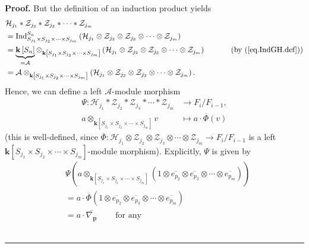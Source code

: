 \documentclass[numbers=enddot,12pt,final,onecolumn,notitlepage]{scrartcl}%
\theoremstyle{definition}
\newenvironment{proof}[1][Proof]{\noindent\textbf{#1.} }{\ \rule{0.5em}{0.5em}}
\begin{document}
\begin{proof}
But the definition of an induction product yields%
\begin{align*}
&  \mathcal{H}_{j_{1}}\ast\mathcal{Z}_{j_{2}}\ast\mathcal{Z}_{j_{3}}\ast
\cdots\ast\mathcal{Z}_{j_{m}}\\
&  =\operatorname*{Ind}\nolimits_{S_{j_{1}}\times S_{j_{2}}\times\cdots\times
S_{j_{m}}}^{S_{n}}\left(  \mathcal{H}_{j_{1}}\otimes\mathcal{Z}_{j_{2}}%
\otimes\mathcal{Z}_{j_{3}}\otimes\cdots\otimes\mathcal{Z}_{j_{m}}\right) \\
&  =\underbrace{\mathbf{k}\left[  S_{n}\right]  }_{=\mathcal{A}}%
\otimes_{\mathbf{k}\left[  S_{j_{1}}\times S_{j_{2}}\times\cdots\times
S_{j_{m}}\right]  }\left(  \mathcal{H}_{j_{1}}\otimes\mathcal{Z}_{j_{2}%
}\otimes\mathcal{Z}_{j_{3}}\otimes\cdots\otimes\mathcal{Z}_{j_{m}}\right)
\ \ \ \ \ \ \ \ \ \ \left(  \text{by (\ref{eq.IndGH.def})}\right) \\
&  =\mathcal{A}\otimes_{\mathbf{k}\left[  S_{j_{1}}\times S_{j_{2}}%
\times\cdots\times S_{j_{m}}\right]  }\left(  \mathcal{H}_{j_{1}}%
\otimes\mathcal{Z}_{j_{2}}\otimes\mathcal{Z}_{j_{3}}\otimes\cdots
\otimes\mathcal{Z}_{j_{m}}\right)  .
\end{align*}
Hence, we can define a left $\mathcal{A}$-module morphism%
\begin{align*}
\Psi:\mathcal{H}_{j_{1}}\ast\mathcal{Z}_{j_{2}}\ast\mathcal{Z}_{j_{3}}%
\ast\cdots\ast\mathcal{Z}_{j_{m}}  &  \rightarrow F_{i}/F_{i-1},\\
a\otimes_{\mathbf{k}\left[  S_{j_{1}}\times S_{j_{2}}\times\cdots\times
S_{j_{m}}\right]  }v  &  \mapsto a\cdot\overline{\Phi}\left(  v\right)
\end{align*}
(this is well-defined, since $\overline{\Phi}:\mathcal{H}_{j_{1}}%
\otimes\mathcal{Z}_{j_{2}}\otimes\mathcal{Z}_{j_{3}}\otimes\cdots
\otimes\mathcal{Z}_{j_{m}}\rightarrow F_{i}/F_{i-1}$ is a left $\mathbf{k}%
\left[  S_{j_{1}}\times S_{j_{2}}\times\cdots\times S_{j_{m}}\right]  $-module
morphism). Explicitly, $\Psi$ is given by%
\begin{align*}
&  \Psi\left(  a\otimes_{\mathbf{k}\left[  S_{j_{1}}\times S_{j_{2}}%
\times\cdots\times S_{j_{m}}\right]  }\left(  1\otimes\overline{e_{p_{2}}%
}\otimes\overline{e_{p_{3}}}\otimes\cdots\otimes\overline{e_{p_{m}}}\right)
\right) \\
&  =a\cdot\overline{\Phi}\left(  1\otimes\overline{e_{p_{2}}}\otimes
\overline{e_{p_{3}}}\otimes\cdots\otimes\overline{e_{p_{m}}}\right) \\
&  =a\cdot\overline{\nabla_{\mathbf{p}}}\ \ \ \ \ \ \ \ \ \ \text{for any
}
\end{align*}
\end{proof}
\end{document}
